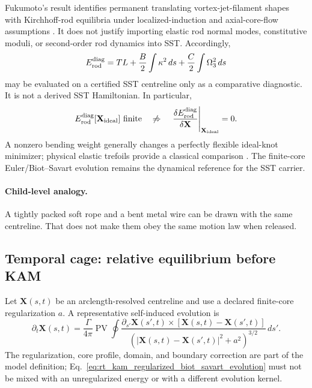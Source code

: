 Fukumoto's result identifies permanent translating vortex-jet-filament shapes
with Kirchhoff-rod equilibria under localized-induction and axial-core-flow
assumptions \cite{Fukumoto2007}.  It does not justify importing elastic rod
normal modes, constitutive moduli, or second-order rod dynamics into SST.
Accordingly,
\begin{equation}
    E_{\rm rod}^{\rm diag}
    =
    T L
    +\frac{B}{2}\int\kappa^2\,ds
    +\frac{C}{2}\int\Omega_3^2\,ds
    \label{eq:rt_rod_energy_diagnostic}
\end{equation}
may be evaluated on a certified SST centreline only as a comparative diagnostic.
It is not a derived SST Hamiltonian.  In particular,
\begin{equation}
    E_{\rm rod}^{\rm diag}[\mathbf X_{\rm ideal}]
    \ \text{finite}
    \quad\not\Rightarrow\quad
    \left.
    \frac{\delta E_{\rm rod}^{\rm diag}}{\delta\mathbf X}
    \right|_{\mathbf X_{\rm ideal}}
    =0.
    \label{eq:rt_ideal_not_rod_equilibrium}
\end{equation}
A nonzero bending weight generally changes a perfectly flexible ideal-knot
minimizer; physical elastic trefoils provide a classical comparison
\cite{JohannsEtAl2021}.  The finite-core Euler/Biot--Savart evolution remains
the dynamical reference for the SST carrier.

\paragraph{Child-level analogy.}
A tightly packed soft rope and a bent metal wire can be drawn with the same
centreline.  That does not make them obey the same motion law when released.


\subsection{Temporal cage: relative equilibrium before KAM}
\label{subsec:rt_kam_temporal_cage}

Let \(\mathbf X(s,t)\) be an arclength-resolved centreline and use a declared
finite-core regularization \(a\).  A representative self-induced evolution is
\begin{equation}
    \partial_t\mathbf X(s,t)
    =
    \frac{\Gamma}{4\pi}
    \operatorname{PV}\!\oint
    \frac{
    \partial_{s'}\mathbf X(s',t)
    \times
    [\mathbf X(s,t)-\mathbf X(s',t)]
    }{
    \left(
    |\mathbf X(s,t)-\mathbf X(s',t)|^2+a^2
    \right)^{3/2}
    }
    \,ds'.
    \label{eq:rt_kam_regularized_biot_savart_evolution}
\end{equation}
The regularization, core profile, domain, and boundary correction are part of
the model definition; Eq.~\eqref{eq:rt_kam_regularized_biot_savart_evolution}
must not be mixed with an unregularized energy or with a different evolution
kernel.


